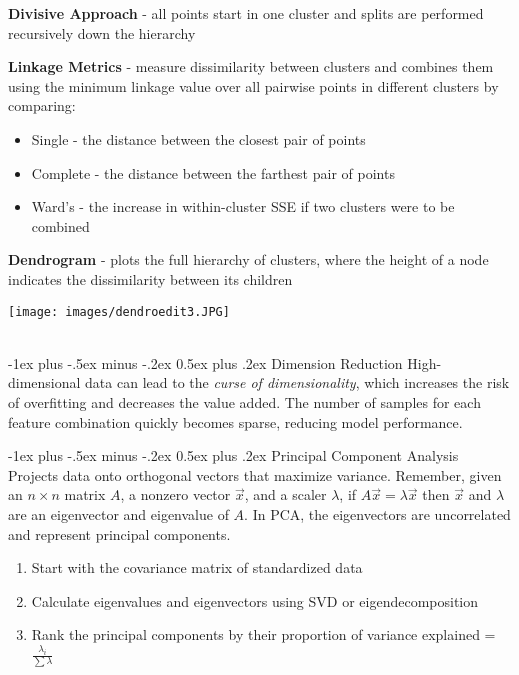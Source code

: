 \documentclass[10pt,landscape]{article}
\makeatletter
\renewcommand{\section}{\@startsection{section}{1}{0mm}%
                                {-1ex plus -.5ex minus -.2ex}%
                                {0.5ex plus .2ex}%
                                {\normalfont\large\bfseries}}
\renewcommand{\subsection}{\@startsection{subsection}{2}{0mm}%
                                {-1ex plus -.5ex minus -.2ex}%
                                {0.5ex plus .2ex}%
                                {\normalfont\normalsize\bfseries}}
\makeatother
\begin{document}
\begin{multicols}{3}
\textbf{Divisive Approach} - all points start in one cluster and splits are performed recursively down the hierarchy

\textbf{Linkage Metrics} - measure dissimilarity between clusters and combines them using the minimum linkage value over all pairwise points in different clusters by comparing:
\begin{itemize}[label={--},leftmargin=4mm]
\itemsep -.4mm
\item Single - the distance between the closest pair of points
\item Complete - the distance between the farthest pair of points
\item Ward's - the increase in within-cluster SSE if two clusters were to be combined
\end{itemize}
\textbf{Dendrogram} - plots the full hierarchy of clusters, where the height of a node indicates the dissimilarity between its children
\begin{center}
    \texttt{[image: images/dendroedit3.JPG]}
\end{center}

\columnbreak
\textcolor{white}{.}\vspace{-5mm}\\ %
\section{Dimension Reduction}
High-dimensional data can lead to the \emph{curse of dimensionality}, which increases the risk of overfitting and decreases the value added. The number of samples for each feature combination quickly becomes sparse, reducing model performance.

\subsection{Principal Component Analysis}
Projects data onto orthogonal vectors that maximize variance.
Remember, given an $n\times n$ matrix $A$, a nonzero vector $\vec{x}$, and a scaler $\lambda$, if $A\vec{x} = \lambda \vec{x}$ then $\vec{x}$ and $\lambda$ are an eigenvector and eigenvalue of $A$. In PCA, the eigenvectors are uncorrelated and represent principal components.
\begin{enumerate}[leftmargin=5mm]
\itemsep -.4mm
\item Start with the covariance matrix of standardized data
\item Calculate eigenvalues and eigenvectors using SVD or eigendecomposition
\item Rank the principal components by their proportion of variance explained = $\frac{\lambda_i}{\sum{\lambda}}$
\end{enumerate}


\end{multicols}
\end{document}
